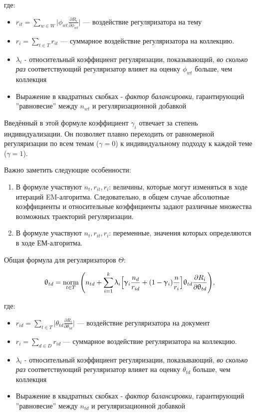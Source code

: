 где:  

\begin{itemize} 
    \item{$r_{it} = \sum_{w\in W} \Big| \phi_{wt} \frac{\partial R_i}{\partial \phi_{wt}} \Big| $ --- воздействие регуляризатора на тему} 
    \item { $r_{i} = \sum_{t\in T} r_{it}$ --- суммарное воздействие регуляризатора на коллекцию.} 
    \item { $\lambda_i$ - относительный коэффициент регуляризации, показывающий, \emph{во сколько раз} соответствующий регуляризатор влияет на оценку $\phi_{wt}$ больше, чем коллекция} 
    \item {Выражение в квадратных скобках - \textit{фактор балансировки}, гарантирующий ''равновесие'' между $n_{wt}$ и регуляризационной добавкой} 
\end{itemize} 

Введённый в этой формуле коэффициент $\gamma_i$ отвечает за степень индивидуализации. Он позволяет плавно переходить от равномерной регуляризации по всем темам ($\gamma = 0$) к индивидуальному подходу к каждой теме ($\gamma = 1$).  

Важно заметить следующие особенности:  

\begin{enumerate} 
    \item {В формуле участвуют $n_t, r_{it}, r_{i}$:  величины, которые могут изменяться в ходе итераций EM-алгоритма. Следовательно, в общем случае абсолютные коэффициенты и относительные  коэффициенты задают различные множества возможных траекторий регуляризации.} 
    \item  {В формуле участвуют $n_t, r_{it}, r_{i}$: переменные, значения которых определяются в ходе ЕМ-алгоритма.} 
\end{enumerate} 

Общая формула для регуляризаторов $\Theta$: 

\[ 
\uptheta_{td} = \mathop{\mathrm{norm}}\limits_{t \in T} \Bigg(  
    n_{td} + \sum_{i=1}^k \uplambda_i \Big[ 
        \upgamma_i \frac{n_d}{r_{id}} + (1-\upgamma_i)\frac{n}{r_i} 
        \Big]  
    \uptheta_{td} \frac{\partial R_i}{\partial \uptheta_{td}} 
\Bigg), \label{rel_theta_general} 
\] 

где:  

\begin{itemize} 
    \item { $r_{id} = \sum_{t\in T} \Big | \theta_{td} \frac{\partial R_i}{\partial \theta_{td}} \Big | $ --- воздействие регуляризатора на документ} 
    \item { $r_{i} = \sum_{d\in D} r_{id}$ --- суммарное воздействие регуляризатора на коллекцию.} 
    \item { $\lambda_i$ - относительный коэффициент регуляризации, показывающий, \emph{во сколько раз} соответствующий регуляризатор влияет на оценку $\theta_{td}$ больше, чем коллекция} 
    \item {Выражение в квадратных скобках - \textit{фактор балансировки}, гарантирующий ''равновесие'' между $n_{td}$ и регуляризационной добавкой} 
\end{itemize} 

